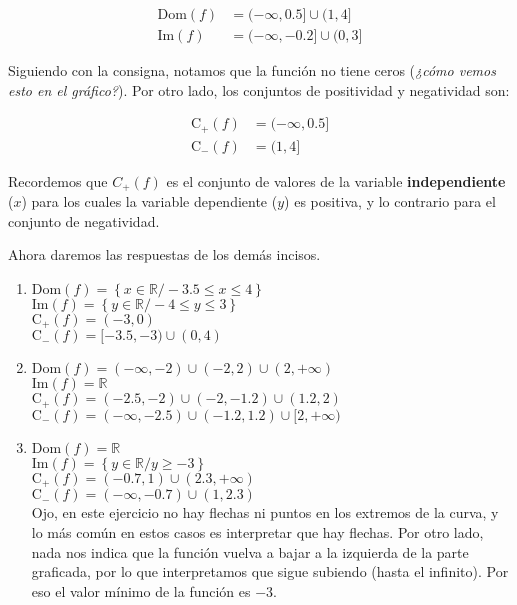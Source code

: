 \documentclass[12pt]{article}
\begin{document}
\begin{enumerate}
\begin{align*}
\text{Dom}(f) &= (-\infty,0.5] \cup (1,4]\\
\text{Im}(f) &= (-\infty,-0.2] \cup (0,3]
\end{align*}

Siguiendo con la consigna, notamos que la función no tiene ceros (\textit{¿cómo vemos esto en el gráfico?}). Por otro lado, los conjuntos de positividad y negatividad son:

\begin{align*}
\text{C}_{+}(f) &= (-\infty,0.5]\\
\text{C}_{-}(f) &= (1,4]
\end{align*}

Recordemos que $C_{+}(f)$ es el conjunto de valores de la variable \textbf{independiente} ($x$) para los cuales la variable dependiente ($y$) es positiva, y lo contrario para el conjunto de negatividad.\par
Ahora daremos las respuestas de los demás incisos.

\begin{enumerate}
	\item 
	$\text{Dom}(f) = \left\{x \in \mathbb{R} / -3.5 \leq x \leq 4\right\}$\\
	$\text{Im}(f) = \left\{y \in \mathbb{R} / -4 \leq y \leq 3\right\}$\\
	$\text{C}_{+}(f) = (-3,0)$\\
	$\text{C}_{-}(f) = [-3.5,-3) \cup (0,4)$ 	\addtocounter{enumii}{1} %
	
	\item 
	$\text{Dom}(f) = (-\infty,-2) \cup (-2,2) \cup (2,+\infty)$\\
	$\text{Im}(f) = \mathbb{R}$\\
	$\text{C}_{+}(f) = (-2.5,-2) \cup (-2,-1.2) \cup (1.2,2)$\\
	$\text{C}_{-}(f) = (-\infty,-2.5) \cup (-1.2,1.2) \cup [2,+\infty)$
	
	\item 
    $\text{Dom}(f) = \mathbb{R}$\\
    $\text{Im}(f) = \left\{y \in \mathbb{R} / y \geq -3\right\}$\\
	$\text{C}_{+}(f) = (-0.7,1) \cup (2.3,+\infty)$\\
    $\text{C}_{-}(f) = (-\infty,-0.7) \cup (1,2.3)$\\
    
    Ojo, en este ejercicio no hay flechas ni puntos en los extremos de la curva, y lo más común en estos casos es interpretar que hay flechas. Por otro lado, nada nos indica que la función vuelva a bajar a la izquierda de la parte graficada, por lo que interpretamos que sigue subiendo (hasta el infinito). Por eso el valor mínimo de la función es $-3$.
    

\end{enumerate}
\end{enumerate}
\end{document}
